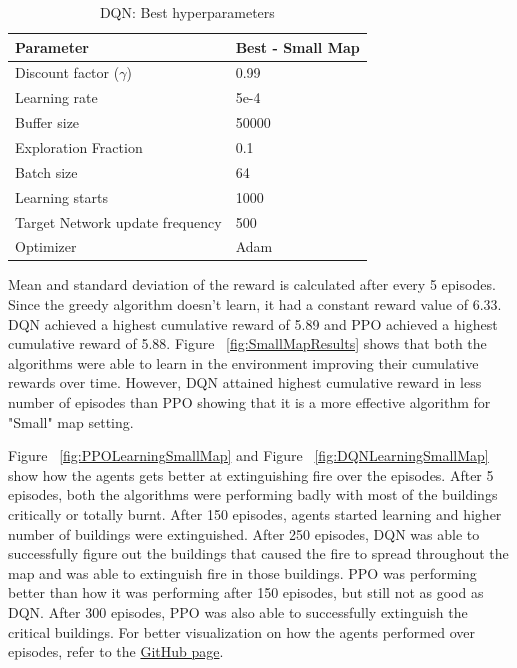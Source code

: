 \documentclass[12pt]{report}
\begin{document}
\begin{table} [!h]
\begin{center}
 \begin{tabular}{l | l} 
 \hline
 Parameter & Best - Small Map  \\ [0.5ex] 
 \hline\hline
 Discount factor ($\gamma$) & 0.99 \\ 
 Learning rate & 5e-4\\
 Buffer size & 50000 \\
 Exploration Fraction & 0.1\\
 Batch size  & 64\\
 Learning starts & 1000\\
 Target Network update frequency & 500\\
 Optimizer & Adam \\ 
 \hline
\end{tabular}
\caption{DQN: Best hyperparameters}
\label{table:BestPPOHyperparameter}
\end{center}
\end{table}

Mean and standard deviation of the reward is calculated after every 5 episodes. Since the greedy algorithm doesn't learn, it had a constant reward value of 6.33. DQN achieved a highest cumulative reward of 5.89 and PPO achieved a highest cumulative reward of 5.88. Figure ~\ref{fig:SmallMapResults} shows that both the algorithms were able to learn in the environment improving their cumulative rewards over time. However, DQN attained highest cumulative reward in less number of episodes than PPO showing that it is a more effective algorithm for "Small" map setting.  

Figure ~\ref{fig:PPOLearningSmallMap} and Figure ~\ref{fig:DQNLearningSmallMap} show how the agents gets better at extinguishing fire over the episodes. After 5 episodes, both the algorithms were performing badly with most of the buildings critically or totally burnt. After 150 episodes, agents started learning and higher number of buildings were extinguished. After 250 episodes, DQN was able to successfully figure out the buildings that caused the fire to spread throughout the map and was able to extinguish fire in those buildings. PPO was performing better than how it was performing after 150 episodes, but still not as good as DQN. After 300 episodes, PPO was also able to successfully extinguish the critical buildings. For better visualization on how the agents performed over episodes, refer to the \href{https://github.com/animeshgoyal9/RoboCup_Rescue_Simulator_Gym_Integration} {GitHub page}. 
\end{document}
